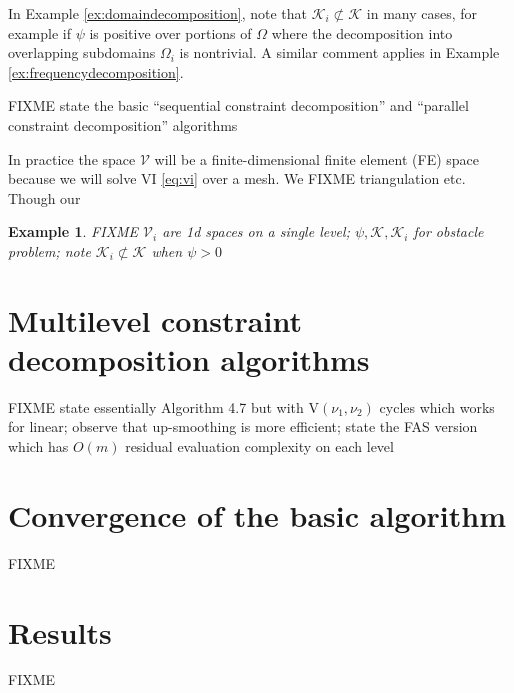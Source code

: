 \documentclass[letterpaper,final,12pt,reqno]{amsart}
\theoremstyle{cstyle}
\theoremstyle{dstyle}
\newtheorem{example}[theorem]{Example}
\numberwithin{equation}{section}
\numberwithin{figure}{section}
\numberwithin{table}{section}
\numberwithin{theorem}{section}
\newcommand{\cK}{\mathcal{K}}
\newcommand{\cV}{\mathcal{V}}
\begin{document}
In Example \ref{ex:domaindecomposition}, note that $\cK_i \not\subset \cK$ in many cases, for example if $\psi$ is positive over portions of $\Omega$ where the decomposition into overlapping subdomains $\Omega_i$ is nontrivial.  A similar comment applies in Example \ref{ex:frequencydecomposition}.


FIXME state the basic ``sequential constraint decomposition'' and ``parallel constraint decomposition'' algorithms

In practice the space $\cV$ will be a finite-dimensional finite element (FE) space because we will solve VI \eqref{eq:vi} over a mesh.  We FIXME triangulation etc. Though our 

\begin{example}  FIXME $\cV_i$ are 1d spaces on a single level; $\psi,\cK,\cK_i$ for obstacle problem; note $\cK_i \not\subset \cK$ when $\psi>0$
\end{example}


\section{Multilevel constraint decomposition algorithms} \label{sec:multilevel}

FIXME state essentially Algorithm 4.7 \cite{GraeserKornhuber2009} but with $\text{V}(\nu_1,\nu_2)$ cycles which works for linear; observe that up-smoothing is more efficient; state the FAS version which has $O(m)$ residual evaluation complexity on each level


\section{Convergence of the basic algorithm} \label{sec:convergence}

FIXME


\section{Results} \label{sec:results}

FIXME


\small

\bigskip


\end{document}
